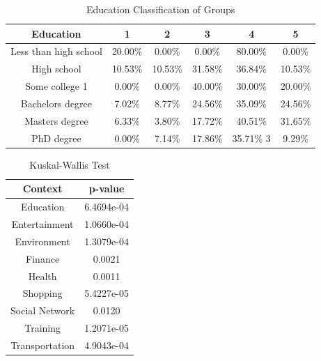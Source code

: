 \begin{table}[h!]
  \centering
  \caption{Education Classification of Groups}
  \label{tab:edu_c}
  \begin{tabular}{cccccc}
    \toprule
     Education&1&2&3&4&5\\
    \midrule
    
Less than high school	&20.00\%	&0.00\%	&0.00\%	&80.00\%	&0.00\%\\
High school	&10.53\%	&10.53\%	&31.58\%	&36.84\%	&10.53\%\\
Some college	1&0.00\%	&0.00\%	&40.00\%	&30.00\%	&20.00\%\\
Bachelors degree	&7.02\%	&8.77\%	&24.56\%	&35.09\%	&24.56\%\\
Masters degree	&6.33\%	&3.80\%	&17.72\%	&40.51\%	&31.65\%\\
PhD degree	&0.00\%	&7.14\%	&17.86\%	&35.71\%	3&9.29\%\\
    \bottomrule
  \end{tabular}
\end{table}  


\begin{table}[h!]
  \centering
  \caption{Kuskal-Wallis Test}
  \label{tab:kw_c}
  \begin{tabular}{cc}
    \toprule
     Context & p-value \\
    \midrule
    Education &  6.4694e-04 \\
    Entertainment & 1.0660e-04\\
    Environment & 1.3079e-04\\
    Finance & 0.0021\\ 
    Health & 0.0011\\
    Shopping & 5.4227e-05\\ 
    Social Network &  0.0120\\
    Training & 1.2071e-05\\
    Transportation & 4.9043e-04\\ 
    \bottomrule
  \end{tabular}
\end{table} 


